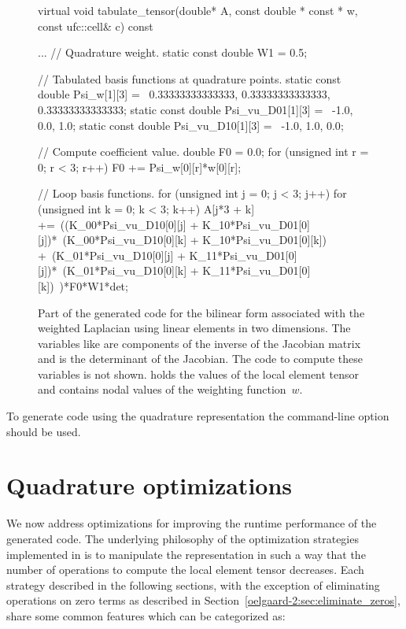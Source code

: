 \begin{figure}
\begin{c++}
virtual void tabulate_tensor(double* A,
                             const double * const * w,
                             const ufc::cell& c) const
{
  ...
  // Quadrature weight.
  static const double W1 = 0.5;

  // Tabulated basis functions at quadrature points.
  static const double Psi_w[1][3] = \
  {{0.33333333333333, 0.33333333333333, 0.33333333333333}};
  static const double Psi_vu_D01[1][3] = \
  {{-1.0, 0.0, 1.0}};
  static const double Psi_vu_D10[1][3] = \
  {{-1.0, 1.0, 0.0}};

  // Compute coefficient value.
  double F0 = 0.0;
  for (unsigned int r = 0; r < 3; r++)
    F0 += Psi_w[0][r]*w[0][r];

  // Loop basis functions.
  for (unsigned int j = 0; j < 3; j++)
  {
    for (unsigned int k = 0; k < 3; k++)
    {
      A[j*3 + k] +=\
      ((K_00*Psi_vu_D10[0][j] + K_10*Psi_vu_D01[0][j])*\
       (K_00*Psi_vu_D10[0][k] + K_10*Psi_vu_D01[0][k]) +\
       (K_01*Psi_vu_D10[0][j] + K_11*Psi_vu_D01[0][j])*\
       (K_01*Psi_vu_D10[0][k] + K_11*Psi_vu_D01[0][k])\
      )*F0*W1*det;
    }
  }
}
\end{c++}
\caption{Part of the generated code for the bilinear form associated
  with the weighted Laplacian using linear elements in two
  dimensions. The variables like \emp{K\_00} are components of the
  inverse of the Jacobian matrix and  is the determinant of the
  Jacobian. The code to compute these variables is not shown. 
  holds the values of the local element tensor and  contains
  nodal values of the weighting function~$w$.}
\label{oelgaard-2:fig:standard_code}
\end{figure}

To generate code using the quadrature representation the \ffc{}
command-line option \emp{-r quadrature} should be used.

\section{Quadrature optimizations}
\label{oelgaard-2:sec:quadrature_optimizations}
\index{quadrature optimizations}

We now address optimizations for improving the runtime performance of
the generated code.  The underlying philosophy of the optimization
strategies implemented in \ffc{} is to manipulate the representation
in such a way that the number of operations to compute the local
element tensor decreases.  Each strategy described in the following
sections, with the exception of eliminating operations on zero terms
as described in Section~\ref{oelgaard-2:sec:eliminate_zeros}, share
some common features which can be categorized as:

